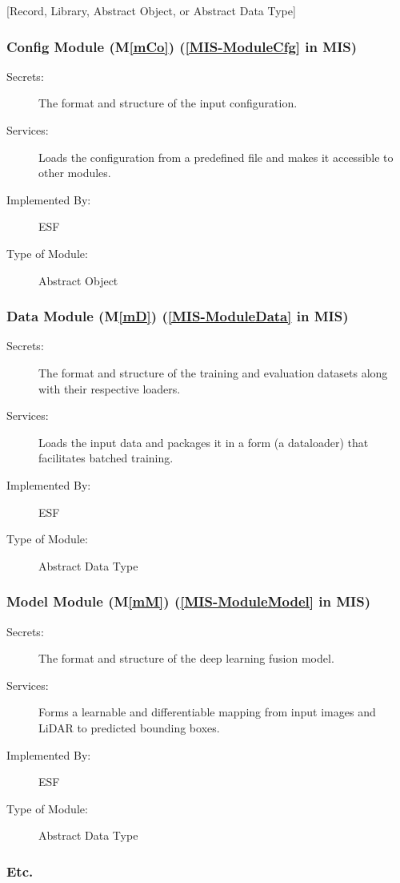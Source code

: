 \documentclass[12pt, titlepage]{article}
\newcommand{\ProjectName}{ESF }
\newcommand{\mref}[1]{M\ref{#1}}
\begin{document}
[Record, Library, Abstract Object, or Abstract Data Type]

\subsubsection{Config Module (\mref{mCo}) (\ref{MIS-ModuleCfg} in MIS)}
\begin{description}
\item[Secrets:] The format and structure of the input configuration.
\item[Services:] Loads the configuration from a predefined file and makes it accessible to other modules.
\item[Implemented By:] \ProjectName{} 
\item[Type of Module:] Abstract Object
\end{description}

\subsubsection{Data Module (\mref{mD}) (\ref{MIS-ModuleData} in MIS)}
\begin{description}
\item[Secrets:] The format and structure of the training and evaluation datasets along with their respective loaders.
\item[Services:] Loads the input data and packages it in a form (a dataloader) that facilitates batched training.
\item[Implemented By:] \ProjectName{}
\item[Type of Module:] Abstract Data Type
\end{description}

\subsubsection{Model Module (\mref{mM}) (\ref{MIS-ModuleModel} in MIS)}
\begin{description}
\item[Secrets:] The format and structure of the deep learning fusion model.
\item[Services:] Forms a learnable and differentiable mapping from input images and LiDAR to predicted bounding boxes.
\item[Implemented By:] \ProjectName{}
\item[Type of Module:] Abstract Data Type
\end{description}
\subsubsection{Etc.}
\end{document}
